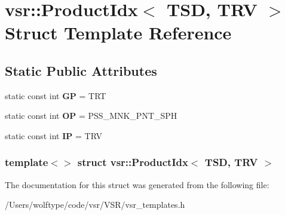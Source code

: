\hypertarget{structvsr_1_1_product_idx_3_01_t_s_d_00_01_t_r_v_01_4}{\section{vsr\-:\-:Product\-Idx$<$ T\-S\-D, T\-R\-V $>$ Struct Template Reference}
\label{structvsr_1_1_product_idx_3_01_t_s_d_00_01_t_r_v_01_4}
}
\subsection*{Static Public Attributes}
\begin{DoxyCompactItemize}
\item 
\hypertarget{structvsr_1_1_product_idx_3_01_t_s_d_00_01_t_r_v_01_4_a2b04516ebe941d67bb3bf410573a2081}{static const int {\bfseries G\-P} = T\-R\-T}\label{structvsr_1_1_product_idx_3_01_t_s_d_00_01_t_r_v_01_4_a2b04516ebe941d67bb3bf410573a2081}

\item 
\hypertarget{structvsr_1_1_product_idx_3_01_t_s_d_00_01_t_r_v_01_4_ad9f4f6f6476b87c1708af69bdad11fd9}{static const int {\bfseries O\-P} = P\-S\-S\-\_\-\-M\-N\-K\-\_\-\-P\-N\-T\-\_\-\-S\-P\-H}\label{structvsr_1_1_product_idx_3_01_t_s_d_00_01_t_r_v_01_4_ad9f4f6f6476b87c1708af69bdad11fd9}

\item 
\hypertarget{structvsr_1_1_product_idx_3_01_t_s_d_00_01_t_r_v_01_4_adb61a219c63ff45ec08f305b1b116445}{static const int {\bfseries I\-P} = T\-R\-V}\label{structvsr_1_1_product_idx_3_01_t_s_d_00_01_t_r_v_01_4_adb61a219c63ff45ec08f305b1b116445}

\end{DoxyCompactItemize}
\subsubsection*{template$<$$>$ struct vsr\-::\-Product\-Idx$<$ T\-S\-D, T\-R\-V $>$}



The documentation for this struct was generated from the following file\-:\begin{DoxyCompactItemize}
\item 
/\-Users/wolftype/code/vsr/\-V\-S\-R/vsr\-\_\-templates.\-h\end{DoxyCompactItemize}
